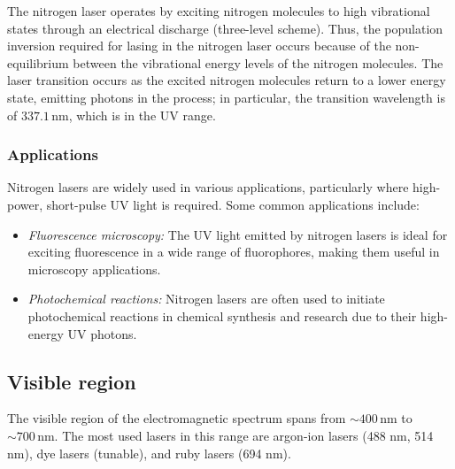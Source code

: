 \documentclass[prl,twocolumn]{revtex4-1}
\begin{document}
The nitrogen laser operates by exciting nitrogen molecules to high vibrational states through an electrical discharge (three-level scheme). Thus, the population inversion required for lasing in the nitrogen laser occurs because of the non-equilibrium between the vibrational energy levels of the nitrogen molecules. The laser transition occurs as the excited nitrogen molecules return to a lower energy state, emitting photons in the process; in particular, the transition wavelength is of $337.1 \, \text{nm}$, which is in the UV range. 

\subsubsection{\textbf{Applications}}
Nitrogen lasers are widely used in various applications, particularly where high-power, short-pulse UV light is required. Some common applications include:
\begin{itemize}
  \item \textit{Fluorescence microscopy:} The UV light emitted by nitrogen lasers is ideal for exciting fluorescence in a wide range of fluorophores, making them useful in microscopy applications.
  \item \textit{Photochemical reactions:} Nitrogen lasers are often used to initiate photochemical reactions in chemical synthesis and research due to their high-energy UV photons.
\end{itemize}

\subsection{Visible region}
The visible region of the electromagnetic spectrum spans from  $\sim400 \, \text{nm}$ to $\sim700 \, \text{nm}$. The most used lasers in this range are argon-ion lasers (488 nm, 514 nm), dye lasers (tunable), and ruby lasers (694 nm).
\end{document}
